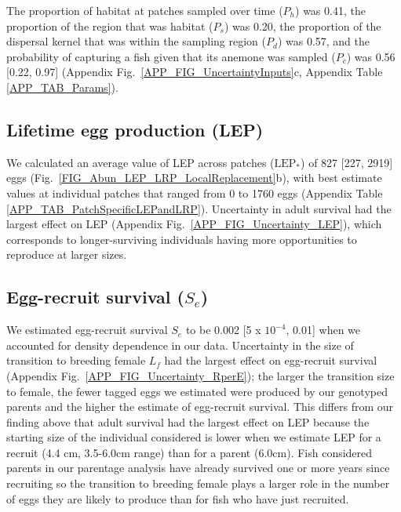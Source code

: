 \documentclass[12pt, oneside]{article}   	%
\begin{document}
The proportion of habitat at patches sampled over time ($P_h$) was 0.41, the proportion of the region that was habitat ($P_s$) was 0.20, the proportion of the dispersal kernel that was within the sampling region ($P_d$) was 0.57, and the probability of capturing a fish given that its anemone was sampled ($P_c$) was 0.56 [0.22, 0.97] (Appendix Fig.\ \ref{APP_FIG_UncertaintyInputs}c, Appendix Table \ref{APP_TAB_Params}).

\subsection{Lifetime egg production (LEP)} \label{APP_SEC_RESULTS_LEP}  %
We calculated an average value of LEP across patches ($\text{LEP}_*$) of 827 [227, 2919] eggs (Fig.\ \ref{FIG_Abun_LEP_LRP_LocalReplacement}b), with best estimate values at individual patches that ranged from 0 to 1760 eggs (Appendix Table \ref{APP_TAB_PatchSpecificLEPandLRP}). Uncertainty in adult survival had the largest effect on LEP (Appendix Fig.\ \ref{APP_FIG_Uncertainty_LEP}), which corresponds to longer-surviving individuals having more opportunities to reproduce at larger sizes. 

\subsection{Egg-recruit survival ($S_e$)} \label{APP_SEC_RESULTS_Egg-recruit_survival}  %

We estimated egg-recruit survival $S_{e}$ to be 0.002 [5 x $10^{-4}$, 0.01] when we accounted for density dependence in our data. Uncertainty in the size of transition to breeding female $L_f$ had the largest effect on egg-recruit survival (Appendix Fig.\ \ref{APP_FIG_Uncertainty_RperE}); the larger the transition size to female, the fewer tagged eggs we estimated were produced by our genotyped parents and the higher the estimate of egg-recruit survival. This differs from our finding above that adult survival had the largest effect on LEP because the starting size of the individual considered is lower when we estimate LEP for a recruit (4.4 cm, 3.5-6.0cm range) than for a parent (6.0cm). Fish considered parents in our parentage analysis have already survived one or more years since recruiting so the transition to breeding female plays a larger role in the number of eggs they are likely to produce than for fish who have just recruited. 
\end{document}
